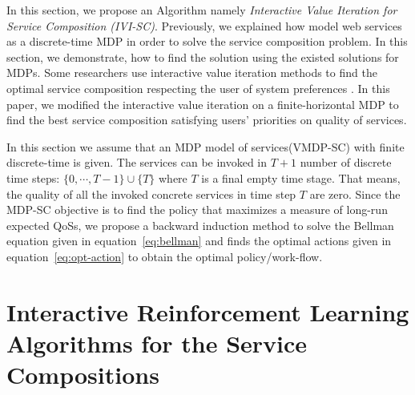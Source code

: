 \documentclass[10pt,journal,compsoc]{IEEEtran}
\begin{document}
In this section, we propose an Algorithm namely \emph{Interactive Value Iteration for Service Composition (IVI-SC)}. Previously, we explained how model web services as a discrete-time MDP in order to solve the service composition problem. In this section, we demonstrate, how to find the solution using the existed solutions for MDPs. Some researchers use interactive value iteration methods to find the optimal service composition respecting the user of system preferences \cite{weng:hal-00942290,alizadeh:hal-01358345}. In this paper, we modified the interactive value iteration on a finite-horizontal MDP to find the best service composition satisfying users' priorities on quality of services. 

In this section we assume that an MDP model of services(VMDP-SC) with finite discrete-time is given. The services can be invoked in $T+1$ number of discrete time steps: $\{0, \cdots,T-1 \} \cup \{T\}$ where $T$ is a final empty time stage. That means, the quality of all the invoked concrete services in time step $T$ are zero.
Since the MDP-SC objective is to find the policy that maximizes a measure of long-run expected QoSs, we propose a backward induction method to solve the Bellman equation given in equation~\ref{eq:bellman} and finds the optimal actions given in equation~\ref{eq:opt-action} to obtain the optimal policy/work-flow. 



\section{Interactive Reinforcement Learning Algorithms for the Service Compositions}
\end{document}
